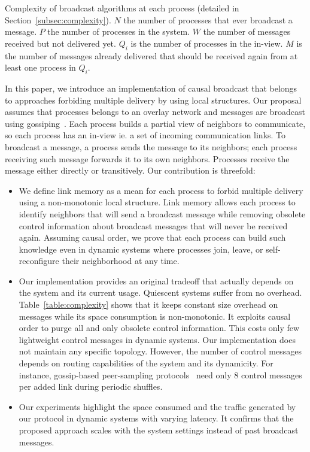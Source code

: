 \begin{table}
  \begin{center}
    \caption{\label{table:complexity} Complexity of broadcast algorithms at each
      process (detailed in Section~\ref{subsec:complexity}). $N$ the number of
      processes that ever broadcast a message. $P$ the number of processes in
      the system. $W$ the number of messages received but not delivered
      yet. $Q_i$ is the number of processes in the in-view. $M$ is the number of
      messages already delivered that should be received again from at least one
      process in $Q_i$.}
  
  \end{center}
\end{table}

In this paper, we introduce an implementation of causal broadcast that belongs
to approaches forbiding multiple delivery by using local
structures. Our proposal assumes that processes belongs to an overlay
network and messages are broadcast using
gossiping~\cite{jelasity2007gossip}. Each process builds a partial
view of neighbors to communicate, so each process has an in-view ie. a
set of incoming communication links. To broadcast a message, a
process sends the message to its neighbors; each process receiving such message
forwards it to its own neighbors. Processes receive the message either directly
or transitively.
%
Our
contribution is threefold:
\begin{itemize}[leftmargin=*]
\item We define link memory as a mean for each process to forbid multiple
  delivery using a non-monotonic local structure. Link memory allows each
  process to identify neighbors that will send a broadcast message while
  removing obsolete control information about broadcast messages that will never
  be received again. Assuming causal order, we prove that each process can build
  such knowledge even in dynamic systems where processes join, leave, or
  self-reconfigure their neighborhood at any time.
\item Our implementation provides an original tradeoff that actually depends on
  the system and its current usage. Quiescent systems suffer from no
  overhead. Table~\ref{table:complexity} shows that it keeps constant size
  overhead on messages while its space consumption is non-monotonic. It exploits
  causal order to purge all and only obsolete control information. This costs
  only few lightweight control messages in dynamic systems.  Our implementation
  does not maintain any specific topology. However, the number of control
  messages depends on routing capabilities of the system and its dynamicity. For
  instance, gossip-based peer-sampling
  protocols~\cite{jelasity2007gossip,jelasity2009tman,nedelec2017adaptive} need
  only 8 control messages per added link during periodic shuffles.
\item Our experiments highlight the space consumed and the traffic generated by
  our protocol in dynamic systems with varying latency. It confirms that the
  proposed approach scales with the system settings instead of past broadcast
  messages.
\end{itemize}
